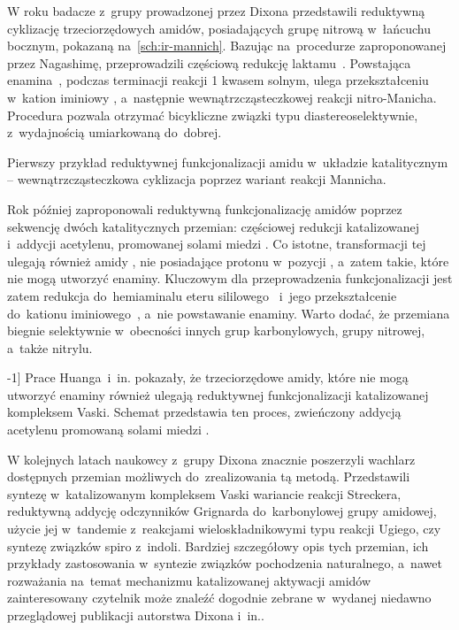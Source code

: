 W roku \citeyear{gregory15} badacze z~grupy prowadzonej przez Dixona przedstawili reduktywną
  cyklizację trzeciorzędowych amidów, posiadających grupę nitrową w~łańcuchu
  bocznym, pokazaną na~\cref{sch:ir-mannich}.
Bazując na~procedurze zaproponowanej przez Nagashimę, przeprowadzili częściową redukcję
  laktamu~.
Powstająca enamina~, podczas terminacji reakcji \SI{1}{\Molar} kwasem solnym,
  ulega przekształceniu w~kation iminiowy , a~następnie wewnątrzcząsteczkowej
  reakcji nitro-Manicha.
Procedura pozwala otrzymać bicykliczne związki typu  diastereoselektywnie,
  z~wydajnością umiarkowaną do~dobrej.
\begin{scheme*}
  
  \caption{
    Pierwszy przykład reduktywnej funkcjonalizacji amidu w~układzie katalitycznym \---
      wewnątrzcząsteczkowa cyklizacja poprzez wariant reakcji Mannicha.
  }
  \label{sch:ir-mannich}
\end{scheme*}

Rok później \citeauthor{huang16c} zaproponowali reduktywną funkcjonalizację amidów poprzez
  sekwencję dwóch katalitycznych przemian: częściowej redukcji katalizowanej \vaska{} i~addycji
  acetylenu, promowanej solami miedzi .
Co istotne, transformacji tej ulegają również amidy , nie posiadające
  protonu w~pozycji \textalpha{}, a~zatem takie, które nie mogą utworzyć enaminy.
Kluczowym dla przeprowadzenia funkcjonalizacji jest zatem redukcja do~hemiaminalu eteru
  sililowego~ i~jego przekształcenie do~kationu iminiowego~,
  a~nie powstawanie enaminy.
Warto dodać, że przemiana biegnie selektywnie w~obecności innych grup karbonylowych, grupy
  nitrowej, a~także nitrylu.
\begin{scheme*}
  
  \caption[][-1\baselineskip]{
    Prace Huanga~i~in. pokazały, że trzeciorzędowe amidy, które nie mogą utworzyć enaminy
      również ulegają reduktywnej funkcjonalizacji katalizowanej kompleksem Vaski.
    Schemat przedstawia ten proces, zwieńczony addycją acetylenu promowaną solami miedzi .
  }
  \label{sch:ir-cu-activation}
\end{scheme*}

W kolejnych latach naukowcy z~grupy Dixona znacznie poszerzyli wachlarz dostępnych przemian
  możliwych do~zrealizowania tą metodą.
Przedstawili syntezę  w~katalizowanym kompleksem Vaski wariancie reakcji
  Streckera,
  reduktywną addycję odczynników Grignarda do~karbonylowej grupy amidowej,
  użycie jej w~tandemie z~reakcjami wieloskładnikowymi typu reakcji Ugiego,
  czy syntezę związków spiro z~indoli.
Bardziej szczegółowy opis tych przemian, ich przykłady zastosowania w~syntezie związków pochodzenia
  naturalnego, a~nawet rozważania na~temat mechanizmu katalizowanej \vaska{} aktywacji amidów
  zainteresowany czytelnik może znaleźć dogodnie zebrane w~wydanej niedawno przeglądowej
  publikacji autorstwa Dixona i~in..

